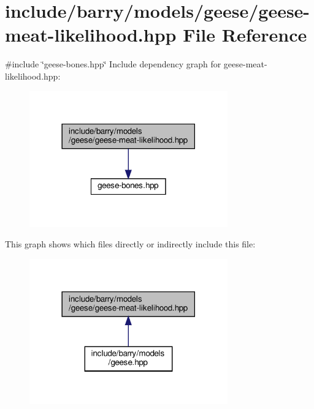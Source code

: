 \hypertarget{geese-meat-likelihood_8hpp}{}\section{include/barry/models/geese/geese-\/meat-\/likelihood.hpp File Reference}
\label{geese-meat-likelihood_8hpp}
{\ttfamily \#include \char`\"{}geese-\/bones.\+hpp\char`\"{}}\newline
Include dependency graph for geese-\/meat-\/likelihood.hpp\+:\nopagebreak
\begin{figure}[H]
\begin{center}
\leavevmode
\includegraphics[width=242pt]{geese-meat-likelihood_8hpp__incl}
\end{center}
\end{figure}
This graph shows which files directly or indirectly include this file\+:\nopagebreak
\begin{figure}[H]
\begin{center}
\leavevmode
\includegraphics[width=242pt]{geese-meat-likelihood_8hpp__dep__incl}
\end{center}
\end{figure}
